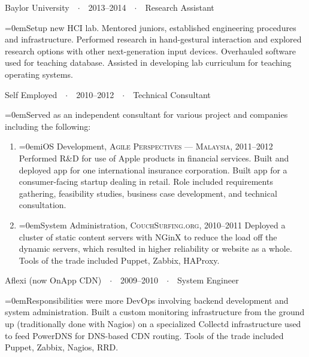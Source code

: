 \documentclass[a4paper]{scrartcl}
\newcommand{\Description}[1]{\hangindent=0em\hangafter=0\noindent\small{#1}\par\normalsize\vspace{1em}} %
\newcommand{\NewBlock}[3]{
    #1\ \ $\cdotp$\ \ #2\ \ $\cdotp$\ \ #3}
\begin{document}
\NewBlock{Baylor University}{2013--2014}{Research Assistant}

\Description{Setup new HCI lab. Mentored juniors, established engineering procedures and infrastructure. Performed research in hand-gestural interaction and explored research options with other next-generation input devices.
Overhauled software used for teaching database.
Assisted in developing lab curriculum for teaching operating systems.
}


\NewBlock{Self Employed}{2010--2012}{Technical Consultant}

\Description{Served as an independent consultant for various project and companies including the following:}
\begin{enumerate}
\item[] \Description{iOS Development, \textsc{Agile Perspectives --- Malaysia}, 2011--2012
\newline
Performed R\&D for use of Apple products in financial services. Built and deployed app for one international insurance corporation. Built app for a consumer-facing startup dealing in retail. Role included requirements gathering, feasibility studies, business case development, and technical consultation. }

\item[] \Description{System Administration, \textsc{CouchSurfing.org}, 2010--2011
\newline
Deployed a cluster of static content servers with NGinX to reduce the load off the dynamic servers, which resulted in higher reliability or website as a whole. Tools of the trade included Puppet, Zabbix, HAProxy. }
\end{enumerate}

\NewBlock{Aflexi (now OnApp CDN)}{2009--2010}{System Engineer}

\Description{Responsibilities were more DevOps involving backend development and system administration. Built a custom monitoring infrastructure from the ground up (traditionally done with Nagios) on a specialized Collectd infrastructure used to feed PowerDNS for DNS-based CDN routing. Tools of the trade included Puppet, Zabbix, Nagios, RRD.
}
\end{document}
